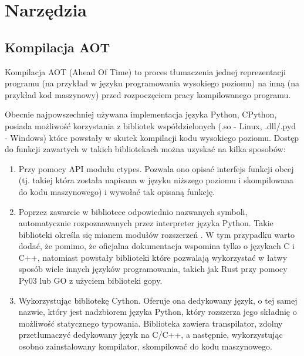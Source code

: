 \documentclass[11pt, a4paper]{article}
\begin{document}
\begin{sloppypar}
    \section{Narzędzia}
    \subsection{Kompilacja AOT}
    Kompilacja AOT (Ahead Of Time) to proces tłumaczenia jednej reprezentacji programu (na
    przykład w języku programowania wysokiego poziomu) na inną (na przykład kod maszynowy)
    przed rozpoczęciem pracy kompilowanego programu.

    Obecnie najpowszechniej używana implementacja języka Python, CPython, posiada
    możliwość korzystania z bibliotek współdzielonych (.so - Linux, .dll/.pyd - Windows)
    które powstały w skutek kompilacji kodu wysokiego poziomu. Dostęp do funkcji zawartych
    w takich bibliotekach można uzyskać na kilka sposobów:

    \begin{enumerate}
      \item Przy pomocy API modułu ctypes\cite{Python_ctypes}. Pozwala ono opisać interfejs
        funkcji obcej (tj. takiej która została napisana w języku niższego poziomu i skompilowana
        do kodu maszynowego) i wywołać tak opisaną funkcję.

      \item Poprzez zawarcie w bibliotece odpowiednio nazwanych symboli, automatycznie
        rozpoznawanych przez interpreter języka Python. Takie biblioteki określa się mianem
        modułów rozszerzeń \cite{Extending_Python_With_C_Cpp}. W tym przypadku warto
        dodać, że pomimo, że oficjalna dokumentacja wspomina tylko o językach C i C++, natomiast
        powstały biblioteki które pozwalają wykorzystać w łatwy sposób wiele innych języków
        programowania, takich jak Rust przy pomocy Py03\cite{PyO3} lub GO z użyciem biblioteki
        gopy\cite{gopy}.

      \item Wykorzystując bibliotekę Cython\cite{Cython_Org}\cite{Cython_The_Best_Of_Both}.
        Oferuje ona dedykowany język, o tej samej nazwie, który jest nadzbiorem języka
        Python, który rozszerza jego składnię o możliwość statycznego typowania.
        Biblioteka zawiera transpilator, zdolny przetłumaczyć dedykowany język na C/C++,
        a następnie, wykorzystując osobno zainstalowany kompilator, skompilować do kodu
        maszynowego.


\end{enumerate}
\end{sloppypar}
\end{document}
